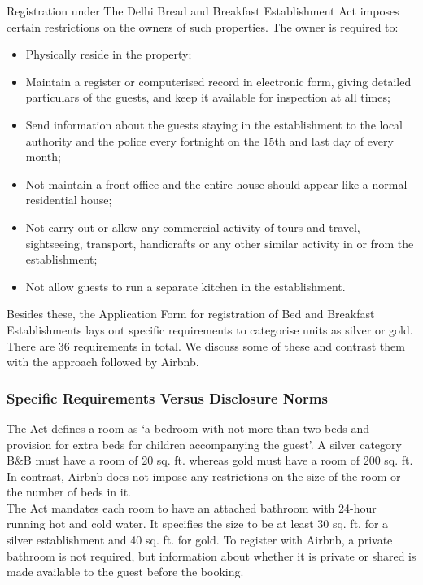 \documentclass[a4paper, 12pt, twoside]{article}
\begin{document}
  Registration under The Delhi Bread and Breakfast Establishment Act imposes certain restrictions on the owners of such properties. The owner is required to: 
\begin{itemize}
\item Physically reside in the property;
\item Maintain a register or computerised record in electronic form, giving detailed particulars of the guests, and keep it available for inspection at all times;
\item  Send information about the guests staying in the establishment to the local authority and the police every fortnight on the 15th and last day of every month;
\item Not maintain a front office and the entire house should appear like a normal residential house;
\item Not carry out or allow any commercial activity of tours and travel, sightseeing, transport, handicrafts or any other similar activity in or from the establishment;
\item  Not allow guests to run a separate kitchen in the establishment.
\end{itemize}                                  
Besides these, the Application Form for registration of Bed and Breakfast Establishments lays out specific requirements to categorise units as silver or gold. There are 36 requirements in total. We discuss some of these and contrast them with the approach followed by Airbnb.

	\subsubsection{Specific Requirements Versus Disclosure Norms}
The Act defines a room as ‘a bedroom with not more than two beds and provision for extra beds for children accompanying the guest’. A silver category B\&B must have a room of 20 sq. ft. whereas gold must have a room of 200 sq. ft. In contrast, Airbnb does not impose any restrictions on the size of the room or the number of beds in it.\\

The Act mandates each room to have an attached bathroom with 24-hour running hot and cold water. It specifies the size to be at least 30 sq. ft. for a silver establishment and 40 sq. ft. for gold. To register with Airbnb, a private bathroom is not required, but information about whether it is private or shared is made available to the guest before the booking.\\
\end{document}

